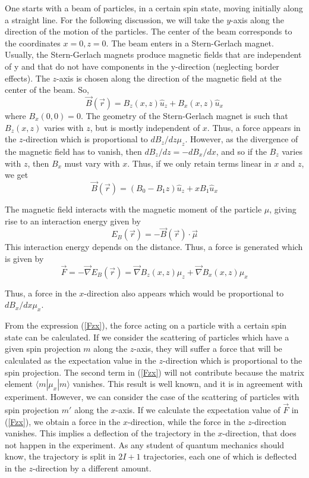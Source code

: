 \documentclass[aps,preprint,prl]{revtex4-2}
\def\grad{\vec\nabla}
\newcommand{\be}{\begin{equation}}
\newcommand{\ee}{\end{equation}}
\begin{document}
One starts with a beam of 
particles, in a certain spin state, moving initially along a straight line. 
For the following discussion, 
we will take the $y$-axis along the direction of the motion of the particles.
The center of the beam corresponds to the coordinates $x=0, z=0$.
The beam enters in a Stern-Gerlach magnet.
Usually, the Stern-Gerlach magnets produce magnetic fields that are independent
of y  and that do not have components in the
y-direction (neglecting border effects). 
The $z$-axis is chosen along the direction of the magnetic field at the 
center of the beam. So,
\be
\vec B(\vec r) = B_z(x,z) \hat u_z + B_x(x,z) \hat u_x
\ee
where $B_x(0,0)=0$.
The geometry of the Stern-Gerlach magnet is such that $B_z(x,z)$ varies with 
 $z$, but is mostly independent of $x$. Thus, a force appears in 
the $z$-direction which is proportional
to $dB_z/dz \mu_z$. However, as the divergence of 
the magnetic field has to vanish, then $dB_z/dz=-dB_x/dx$, and so if the
$B_z$ varies with  $z$, then $B_x$ must vary with  $x$. Thus, if we only retain
terms linear in $x$ and $z$, we get
\be
\vec{B}(\vec r) = (B_0 - B_1 z)\hat{u}_z + x B_1 \hat u_x
\ee

The magnetic field interacts with the magnetic moment of the
particle $\mu$, giving rise to an interaction energy given by
\be
E_B(\vec r) = - \vec B(\vec r) \cdot \vec \mu
\ee
This interaction energy depends on the distance. Thus, a  force is generated
which is given by
\be
\vec F = -\grad E_B(\vec r) = \grad B_z(x,z) \mu_z + \grad B_x(x,z) \mu_x
\label{Fzx}
\ee

Thus, a force in the $x$-direction also appears which would be 
proportional to $dB_x/dx \mu_x$.


From the expression (\ref{Fzx}), the force acting on a particle with a certain 
spin state can be calculated. If we consider the scattering of particles which
have a given spin projection $m$ along the $z$-axis, they will suffer a force
that will be calculated as the expectation value
in the $z$-direction which is proportional to the spin projection. The second
term  in (\ref{Fzx}) will not contribute because the matrix element
$\langle m|\mu_x| m \rangle$ vanishes. This result is well known, and it is in agreement
with experiment. However, we can consider the case of the scattering of
particles with spin projection $m'$ along the $x$-axis. If we calculate the
expectation value of $\vec F$ in (\ref{Fzx}), we  obtain a force in the
$x$-direction, while the force in the $z$-direction vanishes. This  implies a
deflection of the trajectory in the $x$-direction, that does not  happen
in the experiment. As any student of quantum mechanics should know, the 
trajectory is split in $2I+1$ trajectories, each one of which is deflected
in the $z$-direction by a different amount.
\end{document}

